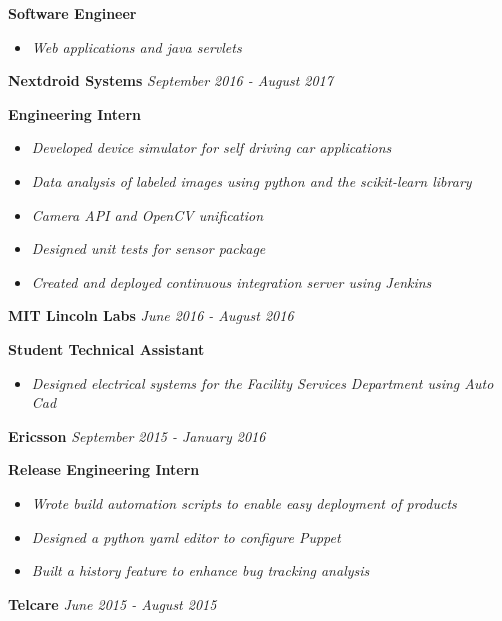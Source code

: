 \documentclass[8pt]{extarticle}
\begin{document}
{\tiny }
\textbf{Software Engineer}
\begin{itemize}
\item \textit{Web applications and java servlets}
\end{itemize}
\textbf{Nextdroid Systems} \hfill\textit{September 2016 - August 2017}

{\tiny }
\textbf{Engineering Intern} 
\begin{itemize}
\item \textit{Developed device simulator for self driving car applications}
\item \textit{Data analysis of labeled images using python and the scikit-learn library}
\item \textit{Camera API and OpenCV unification}
\item \textit{Designed unit tests for sensor package}
\item \textit{Created and deployed continuous integration server using Jenkins}
\end{itemize}
\textbf{MIT Lincoln Labs} \hfill\textit{June  2016 - August 2016}

\textbf{Student Technical Assistant } 
\begin{itemize}
\item \textit{Designed electrical systems for the Facility Services Department using Auto Cad}
\end{itemize}
\textbf{Ericsson} \textit{September  2015 - January 2016}

\textbf{Release Engineering Intern } 
\begin{itemize}
\item \textit{Wrote build automation scripts to enable easy deployment of products}
\item \textit{Designed a python yaml editor to configure Puppet}
\item \textit{Built a history feature to enhance bug tracking analysis}

\end{itemize}
\textbf{Telcare} \hfill\textit{June  2015 - August 2015}
\end{document}
